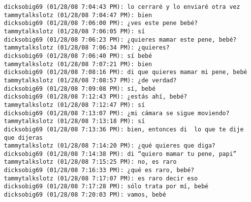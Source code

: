 \begin{verbatim}
dicksobig69 (01/28/08 7:04:43 PM): lo cerraré y lo enviaré otra vez
tammytalkslotz (01/28/08 7:04:47 PM): bien
dicksobig69 (01/28/08 7:06:00 PM): ¿ves este pene bebé?
tammytalkslotz (01/28/08 7:06:05 PM): sí
dicksobig69 (01/28/08 7:06:23 PM): ¿quieres mamar este pene, bebé?
tammytalkslotz (01/28/08 7:06:34 PM): ¿quieres?
dicksobig69 (01/28/08 7:06:40 PM): sí bebé
tammytalkslotz (01/28/08 7:07:21 PM): bien
dicksobig69 (01/28/08 7:08:16 PM): di que quieres mamar mi pene, bebé
tammytalkslotz (01/28/08 7:08:57 PM): ¿de verdad?
dicksobig69 (01/28/08 7:09:08 PM): sí, bebé
dicksobig69 (01/28/08 7:12:43 PM): ¿estás ahí, bebé?
tammytalkslotz (01/28/08 7:12:47 PM): sí
dicksobig69 (01/28/08 7:13:07 PM): ¿mi cámara se sigue moviendo?
tammytalkslotz (01/28/08 7:13:18 PM): sí
dicksobig69 (01/28/08 7:13:36 PM): bien, entonces di  lo que te dije que dijeras
tammytalkslotz (01/28/08 7:14:20 PM): ¿qué quieres que diga?
dicksobig69 (01/28/08 7:14:38 PM): di “quiero mamar tu pene, papi”
tammytalkslotz (01/28/08 7:15:25 PM): no, es raro
dicksobig69 (01/28/08 7:16:33 PM): ¿qué es raro, bebé?
tammytalkslotz (01/28/08 7:17:07 PM): es raro decir eso
dicksobig69 (01/28/08 7:17:28 PM): sólo trata por mí, bebé
dicksobig69 (01/28/08 7:20:03 PM): vamos, bebé

\end{verbatim}